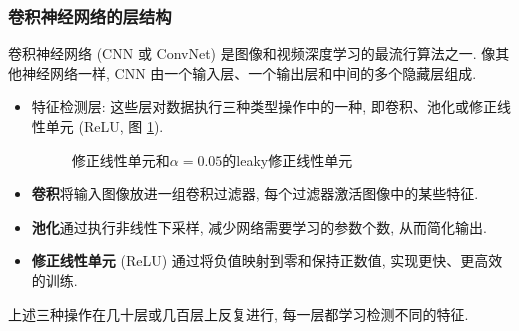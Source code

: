 \subsubsection{卷积神经网络的层结构}
卷积神经网络 (CNN 或 ConvNet) 是图像和视频深度学习的最流行算法之一.
像其他神经网络一样, CNN 由一个输入层、一个输出层和中间的多个隐藏层组成.
\begin{itemize}
    \item 特征检测层: 这些层对数据执行三种类型操作中的一种, 即卷积、池化或修正线性单元 (ReLU, 图 \ref{ReLU20200203001}).
    \begin{figure}[H]
    \begin{center}
    \end{center}
    \caption{修正线性单元和$\alpha=0.05$的leaky修正线性单元}
    \label{ReLU20200203001}
    \end{figure}
    \item \textbf{卷积}将输入图像放进一组卷积过滤器, 每个过滤器激活图像中的某些特征.
    \item \textbf{池化}通过执行非线性下采样, 减少网络需要学习的参数个数, 从而简化输出.
    \item \textbf{修正线性单元} (ReLU) 通过将负值映射到零和保持正数值, 实现更快、更高效的训练.
\end{itemize}
上述三种操作在几十层或几百层上反复进行, 每一层都学习检测不同的特征.
